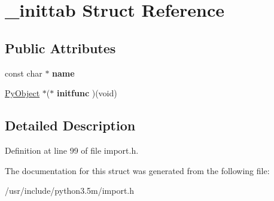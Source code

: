 \hypertarget{struct__inittab}{}\section{\+\_\+inittab Struct Reference}
\label{struct__inittab}
\subsection*{Public Attributes}
\begin{DoxyCompactItemize}
\item 
const char $\ast$ {\bfseries name}\hypertarget{struct__inittab_a455e2fe04a87fc527504a5e137e15683}{}\label{struct__inittab_a455e2fe04a87fc527504a5e137e15683}

\item 
\hyperlink{struct__object}{Py\+Object} $\ast$($\ast$ {\bfseries initfunc} )(void)\hypertarget{struct__inittab_a61308b4ffb48cffb3bfd617a34c36f55}{}\label{struct__inittab_a61308b4ffb48cffb3bfd617a34c36f55}

\end{DoxyCompactItemize}


\subsection{Detailed Description}


Definition at line 99 of file import.\+h.



The documentation for this struct was generated from the following file\+:\begin{DoxyCompactItemize}
\item 
/usr/include/python3.\+5m/import.\+h\end{DoxyCompactItemize}
